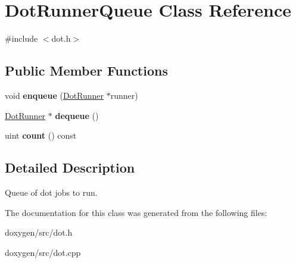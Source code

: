 \hypertarget{class_dot_runner_queue}{}\section{Dot\+Runner\+Queue Class Reference}
\label{class_dot_runner_queue}


{\ttfamily \#include $<$dot.\+h$>$}

\subsection*{Public Member Functions}
\begin{DoxyCompactItemize}
\item 
\mbox{\label{class_dot_runner_queue_a5574ec90088f55eb96016a84d2b51e9f}} 
void {\bfseries enqueue} (\mbox{\hyperlink{class_dot_runner}{Dot\+Runner}} $\ast$runner)
\item 
\mbox{\label{class_dot_runner_queue_adcfd55c84ad0e67666f86554b9284a3b}} 
\mbox{\hyperlink{class_dot_runner}{Dot\+Runner}} $\ast$ {\bfseries dequeue} ()
\item 
\mbox{\label{class_dot_runner_queue_a4c22a3b73a87c0655247dbb184711a38}} 
uint {\bfseries count} () const
\end{DoxyCompactItemize}


\subsection{Detailed Description}
Queue of dot jobs to run. 

The documentation for this class was generated from the following files\+:\begin{DoxyCompactItemize}
\item 
doxygen/src/dot.\+h\item 
doxygen/src/dot.\+cpp\end{DoxyCompactItemize}
